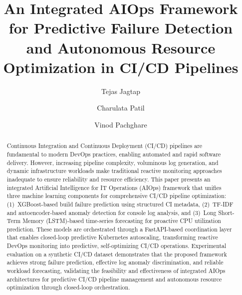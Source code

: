 \documentclass[a4paper,fleqn]{cas-dc}
\begin{document}
\let\WriteBookmarks\relax
\def\floatpagepagefraction{1}
\def\textpagefraction{.001}

\setlength{\emergencystretch}{3em}
\sloppy






\title{An Integrated AIOps Framework for Predictive Failure Detection and Autonomous Resource Optimization in CI/CD Pipelines}


\author[1]{Tejas Jagtap}
\cormark[1]



\author[1]{Charulata Patil}


\author[1]{Vinod Pachghare}



\begin{abstract}
Continuous Integration and Continuous Deployment (CI/CD) pipelines are fundamental to modern DevOps practices, enabling automated and rapid software delivery.
However, increasing pipeline complexity, voluminous log generation, and dynamic infrastructure workloads make traditional reactive monitoring approaches inadequate to ensure reliability and resource efficiency.
This paper presents an integrated Artificial Intelligence for IT Operations (AIOps) framework that unifies three machine learning components for comprehensive CI/CD pipeline optimization: (1)~XGBoost-based build failure prediction using structured CI metadata, (2)~TF-IDF and autoencoder-based anomaly detection for console log analysis, and (3)~Long Short-Term Memory (LSTM)-based time-series forecasting for proactive CPU utilization prediction.
These models are orchestrated through a FastAPI-based coordination layer that enables closed-loop predictive Kubernetes autoscaling, transforming reactive DevOps monitoring into predictive, self-optimizing CI/CD operations.
Experimental evaluation on a synthetic CI/CD dataset demonstrates that the proposed framework achieves strong failure prediction, effective log anomaly discrimination, and reliable workload forecasting, validating the feasibility and effectiveness of integrated AIOps architectures for predictive CI/CD pipeline management and autonomous resource optimization through closed-loop orchestration.
\end{abstract}
\end{document}
